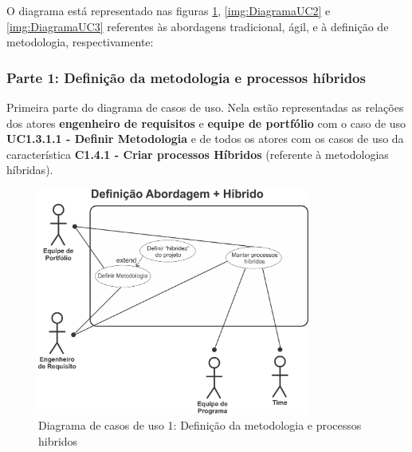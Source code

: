 O diagrama está representado nas figuras \ref{img:DiagramaUC1}, \ref{img:DiagramaUC2} e \ref{img:DiagramaUC3} referentes às abordagens tradicional, ágil, e à definição de metodologia, respectivamente:
\newpage
\subsubsection{Parte 1: Definição da metodologia e processos híbridos}
	Primeira parte do diagrama de casos de uso. Nela estão representadas as relações dos atores \textbf{engenheiro de requisitos} e \textbf{equipe de portfólio} com o caso de uso \textbf{UC1.3.1.1 - Definir Metodologia} e de todos os atores com os casos de uso da característica \textbf{C1.4.1 - Criar processos Híbridos} (referente à metodologias híbridas).
	\\
\begin{figure}[H]
	\centering
	\includegraphics[width=0.8\textwidth]{imgModelagem/DiagramaUC1}
	\caption{Diagrama de casos de uso 1: Definição da metodologia e processos hibridos}
	\label{img:DiagramaUC1}
\end{figure}
\newpage
